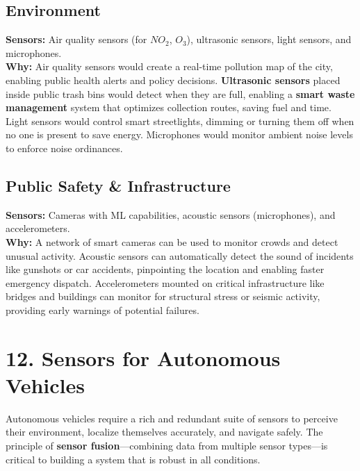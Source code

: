 \documentclass[a4paper,12pt]{article}
\begin{document}
\subsection*{Environment}
\textbf{Sensors:} Air quality sensors (for $NO_2$, $O_3$), ultrasonic sensors, light sensors, and microphones. \\
\textbf{Why:} Air quality sensors would create a real-time pollution map of the city, enabling public health alerts and policy decisions. \textbf{Ultrasonic sensors} placed inside public trash bins would detect when they are full, enabling a \textbf{smart waste management} system that optimizes collection routes, saving fuel and time. Light sensors would control smart streetlights, dimming or turning them off when no one is present to save energy. Microphones would monitor ambient noise levels to enforce noise ordinances. 

\subsection*{Public Safety \& Infrastructure}
\textbf{Sensors:} Cameras with ML capabilities, acoustic sensors (microphones), and accelerometers. \\
\textbf{Why:} A network of smart cameras can be used to monitor crowds and detect unusual activity. Acoustic sensors can automatically detect the sound of incidents like gunshots or car accidents, pinpointing the location and enabling faster emergency dispatch. Accelerometers mounted on critical infrastructure like bridges and buildings can monitor for structural stress or seismic activity, providing early warnings of potential failures. 

\section*{12. Sensors for Autonomous Vehicles}

Autonomous vehicles require a rich and redundant suite of sensors to perceive their environment, localize themselves accurately, and navigate safely. The principle of \textbf{sensor fusion}—combining data from multiple sensor types—is critical to building a system that is robust in all conditions. 
\end{document}
